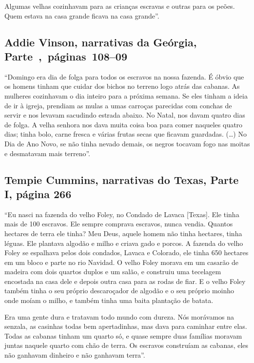 Algumas velhas cozinhavam para as crianças escravas e outras para os
peões. Quem estava na casa grande ficava na casa grande''.

\subsection{Addie Vinson, narrativas da Geórgia, Parte~,~páginas~108--09}
\label{ref266}

``Domingo era dia de folga para todos os escravos na nossa fazenda. É
óbvio que os homens tinham que cuidar dos bichos no terreno logo atrás
das cabanas. As mulheres cozinhavam o dia inteiro para a próxima semana.
Se eles tinham a ideia de ir à igreja, prendiam as mulas a umas carroças
parecidas com conchas de servir e nos levavam sacudindo estrada abaixo.
No Natal, nos davam quatro dias de folga. A velha senhora nos dava muita
coisa boa para comer naqueles quatro dias; tinha bolo, carne fresca e
várias frutas secas que ficavam guardadas. (\ldots{}) No Dia de Ano
Novo, se não tinha nevado demais, os negros tocavam fogo nas moitas e
desmatavam mais terreno''.

\subsection{Tempie Cummins, narrativas do Texas, Parte I, página 266} \label{ref64}

``Eu nasci na fazenda do velho Foley, no Condado de Lavaca {[}Texas{]}.
Ele tinha mais de 100 escravos. Ele sempre comprava escravos, nunca
vendia. Quantos hectares de terra ele tinha? Meu Deus, aquele homem não
tinha hectares, tinha léguas. Ele plantava algodão e milho e criava gado
e porcos. A fazenda do velho Foley se espalhava pelos dois condados,
Lavaca e Colorado, ele tinha 650 hectares em um bloco e parte no rio
Navidad. O velho Foley morava em um casarão de madeira com dois quartos
duplos e um salão, e construiu uma tecelagem encostada na casa dele e
depois outra casa para as rodas de fiar. E o velho Foley também tinha o
seu próprio descaroçador de algodão e o seu próprio moinho onde moíam o
milho, e também tinha uma baita plantação de batata.

Era uma gente dura e tratavam todo mundo com dureza. Nós morávamos na
senzala, as casinhas todas bem apertadinhas, mas dava para caminhar
entre elas. Todas as cabanas tinham um quarto só, e quase sempre duas
famílias moravam juntas naquele quarto com chão de terra. Os escravos
construíam as cabanas, eles não ganhavam dinheiro e não ganhavam
terra''.

